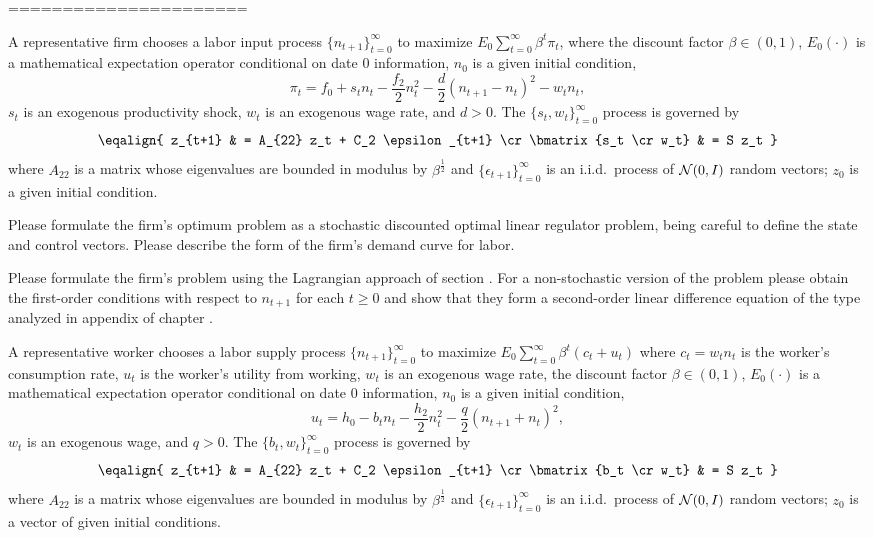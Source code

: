 
======================




\medskip
{} 
\medskip
\noindent
A representative firm chooses a labor input process $\{n_{t+1}\}_{t=0}^\infty$ to maximize $E_0 \sum_{t=0}^\infty \beta^t \pi_t$,
where the discount factor $\beta \in (0,1)$, $E_0(\cdot)$ is a mathematical expectation operator conditional on date $0$ information, $n_0$
is a given initial condition,
$$ \pi_t = f_0 + s_t n_t - {\frac {f_2}{2}} n_t^2 - {\frac{d}{2}} (n_{t+1} - n_t)^2 - w_t n_t, $$
  $s_t$ is an exogenous productivity shock, $w_t$ is an exogenous wage rate, and $d > 0$.  The $\{s_t, w_t\}_{t=0}^\infty$ process is governed by
$$\eqalign{ z_{t+1}  & = A_{22} z_t + C_2 \epsilon_{t+1} \cr
            \bmatrix{s_t \cr w_t} & = S z_t }$$
where $A_{22}$ is a matrix whose eigenvalues are bounded in modulus by $\beta^{\frac{1}{2}}$ and $\{\epsilon_{t+1}\}_{t=0}^\infty$ is an i.i.d.~process
of ${\cal N}(0,I)$ random vectors; $z_0$ is a given initial condition.

\medskip
{} Please formulate the firm's optimum problem as a stochastic discounted optimal linear regulator problem, being careful to define the
state and control vectors.  Please describe the form of the firm's demand curve for labor.

\medskip
{} Please formulate the firm's problem using the Lagrangian approach of section .
 For a non-stochastic version of the problem
 please obtain the first-order conditions with respect to $n_{t+1}$ for each $t \geq 0$ and show that they form a  second-order
 linear difference equation of the type  analyzed in appendix  of chapter .






\medskip
{} 
\medskip
\noindent
A representative worker chooses a labor supply process $\{n_{t+1}\}_{t=0}^\infty$ to maximize $E_0 \sum_{t=0}^\infty \beta^t (c_t + u_t)$
where  $c_t = w_t n_t$ is the worker's consumption rate, $u_t$ is the worker's utility from working,  $w_t$ is an exogenous wage rate, the discount factor $\beta \in (0,1)$, $E_0(\cdot)$ is a mathematical expectation operator conditional on date $0$ information, $n_0$
is a given initial condition,
$$ u_t = h_0  - b_t n_t - {\frac {h_2}{2}} n_t^2 - {\frac{q}{2}} (n_{t+1} + n_t)^2 , $$
 $w_t$ is an exogenous wage, and $q > 0$.  The $\{b_t, w_t\}_{t=0}^\infty$ process is governed by
$$\eqalign{ z_{t+1}  & = A_{22} z_t + C_2 \epsilon_{t+1} \cr
            \bmatrix{b_t \cr w_t} & = S z_t }$$
where $A_{22}$ is a matrix whose eigenvalues are bounded in modulus by $\beta^{\frac{1}{2}}$ and $\{\epsilon_{t+1}\}_{t=0}^\infty$ is an i.i.d.~process
of ${\cal N}(0,I)$ random vectors; $z_0$ is a vector of given initial conditions.

